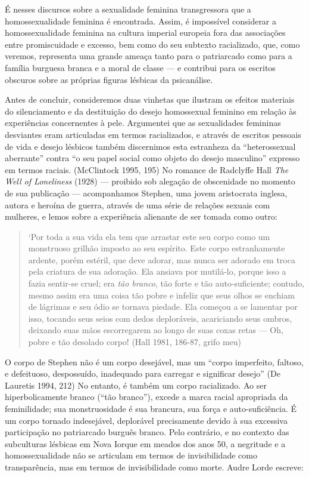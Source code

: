 É nesses discursos sobre a sexualidade feminina transgressora que a
homossexualidade feminina é encontrada. Assim, é impossível considerar a
homossexualidade feminina na cultura imperial europeia fora das
associações entre promiscuidade e excesso, bem como do seu subtexto
racializado, que, como veremos, representa uma grande ameaça tanto para
o patriarcado como para a família burguesa branca e a moral de classe ---
e contribui para os escritos obscuros sobre as próprias figuras lésbicas
da psicanálise.

Antes de concluir, consideremos duas vinhetas que ilustram os efeitos
materiais do silenciamento e da destituição do desejo homossexual
feminino em relação às experiências concernentes à pele. Argumentei que
as sexualidades femininas desviantes eram articuladas em termos
racializados, e através de escritos pessoais de vida e desejo lésbicos
também discernimos esta estranheza da ``heterossexual aberrante'' contra
``o seu papel social como objeto do desejo masculino'' expresso em termos
raciais. (McClintock 1995, 195) No romance de Radclyffe Hall \emph{The
Well of Loneliness} (1928) --- proibido sob alegação de obscenidade no
momento de sua publicação --- acompanhamos Stephen, uma jovem aristocrata
inglesa, autora e heroína de guerra, através de uma série de relações
sexuais com mulheres, e lemos sobre a experiência alienante de ser
tomada como outro:

\begin{quote}
`Por toda a sua vida ela tem que arrastar este seu corpo como um
monstruoso grilhão imposto ao seu espírito. Este corpo estranhamente
ardente, porém estéril, que deve adorar, mas nunca ser adorado em troca
pela criatura de sua adoração. Ela ansiava por mutilá-lo, porque isso a
fazia sentir-se cruel; era \emph{tão branco}, tão forte e tão
auto-suficiente; contudo, mesmo assim era uma coisa tão pobre e infeliz
que seus olhos se enchiam de lágrimas e seu ódio se tornava piedade. Ela
começou a se lamentar por isso, tocando seus seios com dedos
deploráveis, acariciando seus ombros, deixando suas mãos escorregarem ao
longo de suas coxas retas --- Oh, pobre e tão desolado corpo! (Hall 1981,
186-87, grifo meu)
\end{quote}

O corpo de Stephen não é um corpo desejável, mas um ``corpo imperfeito,
faltoso, e defeituoso, despossuído, inadequado para carregar e
significar desejo'' (De Lauretis 1994, 212) No entanto, é também um
corpo racializado. Ao ser hiperbolicamente branco (``tão branco''), excede
a marca racial apropriada da feminilidade; sua monstruosidade é sua
brancura, sua força e auto-suficiência. É um corpo tornado indesejável,
deplorável precisamente devido à sua excessiva participação no
patriarcado burguês branco. Pelo contrário, e no contexto das
subculturas lésbicas em Nova Iorque em meados dos anos 50, a negritude e
a homossexualidade não se articulam em termos de invisibilidade como
transparência, mas em termos de invisibilidade como morte. Audre Lorde
escreve:


